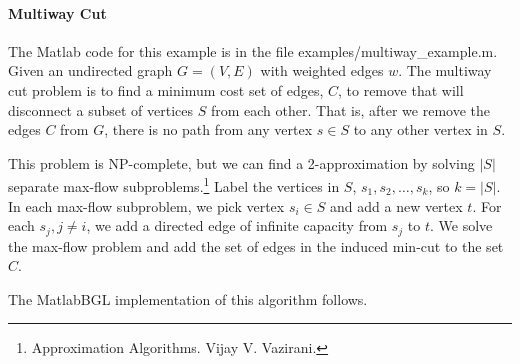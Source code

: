 \documentclass[12pt]{article}
\newcommand{\mypath}[1]{{\ttfamily \small #1}}
\begin{document}
\paragraph{Multiway Cut}

The Matlab code for this example is in the file \mypath{examples/multiway\_example.m}.  
Given an undirected graph $G=(V,E)$ with weighted edges $w$.  The multiway cut problem is to find a minimum cost set of edges, $C$, to remove that will disconnect a subset of vertices $S$ from each other.  That is, after we remove the edges $C$ from $G$, there is no path from any vertex $s \in S$ to any other vertex in $S$.  

This problem is NP-complete, but we can find a 2-approximation by solving $|S|$ separate max-flow subproblems.\footnote{Approximation Algorithms.  Vijay V. Vazirani.}  Label the vertices in $S$, $s_1, s_2, \ldots, s_k$, so $k = |S|$.  In each max-flow subproblem, we pick vertex $s_i \in S$ and add a new vertex $t$.  For each $s_j, j\not=i$, we add a directed edge of infinite capacity from $s_j$ to $t$.  We solve the max-flow problem and add the set of edges in the induced min-cut to the set $C$.  

The MatlabBGL implementation of this algorithm follows.
\end{document}
